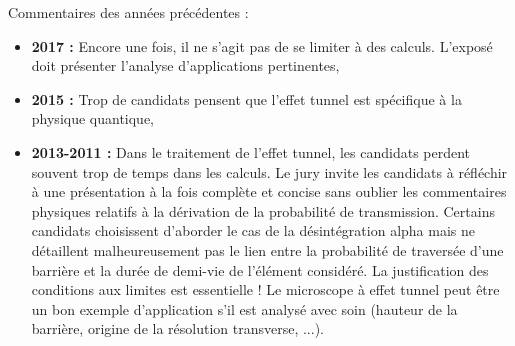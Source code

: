 \begin{reportBlock}{Commentaires des années précédentes :}
    \begin{itemize}
        \item \textbf{2017 :} Encore une fois, il ne s’agit pas de se limiter à des calculs. L’exposé doit présenter l’analyse d’applications pertinentes,
        \item \textbf{2015 :} Trop de candidats pensent que l’effet tunnel est spécifique à la physique quantique,
        \item \textbf{2013-2011 :} Dans le traitement de l’effet tunnel, les candidats perdent souvent trop de temps dans les calculs. Le jury invite les candidats à réfléchir à une présentation à la fois complète et concise sans oublier les commentaires physiques relatifs à la dérivation de la probabilité de transmission. Certains candidats choisissent d’aborder le cas de la désintégration alpha mais ne détaillent malheureusement pas le lien entre la probabilité de traversée d’une barrière et la durée de demi-vie de l’élément considéré. La justification des conditions aux limites est essentielle ! Le microscope à effet tunnel peut être un bon exemple d’application s’il est analysé avec soin (hauteur de la barrière, origine de la résolution transverse, ...).
    \end{itemize}
\end{reportBlock}
